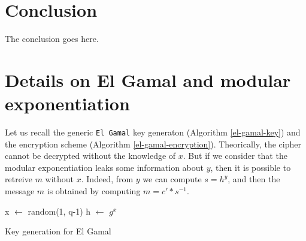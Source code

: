 \documentclass[journal]{IEEEtran}
\begin{document}
\section{Conclusion}
The conclusion goes here.


\clearpage




%


\appendices
\section{Details on El Gamal and modular exponentiation}
\label{ElGamal}
Let us recall the generic {\tt El Gamal} key generaton (Algorithm \ref{el-gamal-key})
and the encryption scheme (Algorithm \ref{el-gamal-encryption}).
Theorically, the cipher cannot be decrypted without the knowledge of $x$. But if we consider that
the modular exponentiation leaks some information about $y$, then it is possible to retreive $m$ without $x$.
Indeed, from $y$ we can compute $s = h^y$, and then the message $m$ is obtained by computing $m = c' * s^{-1}$.


\begin{algorithm}
    \SetAlgoLined %
   
    \SetSideCommentLeft 
    \SetNoFillComment

    
    
    x $\leftarrow$ random(1, q-1)\;
    h $\leftarrow$ $g^x$\;


    \bigskip

    \caption{Key generation for El Gamal}
    \label{el-gamal-key}

\end{algorithm}
\end{document}
